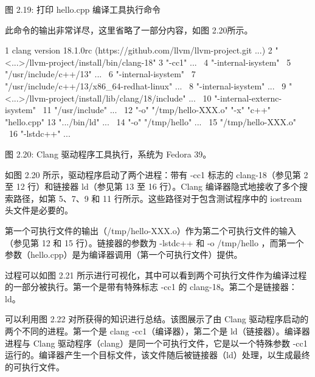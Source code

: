 \begin{center}
图 2.19: 打印 hello.cpp 编译工具执行命令
\end{center}

此命令的输出非常详尽，这里省略了一部分内容，如图 2.20所示。

\begin{shell}
1   clang version 18.1.0rc (https://github.com/llvm/llvm-project.git ...)
2   "<...>/llvm-project/install/bin/clang-18"
3     "-cc1" ... \
4     "-internal-isystem" \
5     "/usr/include/c++/13" ... \
6     "-internal-isystem" \
7     "/usr/include/c++/13/x86_64-redhat-linux" ... \
8     "-internal-isystem" ... \
9     "<...>/llvm-project/install/lib/clang/18/include" ... \
10    "-internal-externc-isystem" \
11    "/usr/include" ... \
12    "-o" "/tmp/hello-XXX.o" "-x" "c++" "hello.cpp"
13  ".../bin/ld" ... \
14    "-o" "/tmp/hello" ... \
15    "/tmp/hello-XXX.o" \
16    "-lstdc++" ...
\end{shell}

\begin{center}
图 2.20: Clang 驱动程序工具执行，系统为 Fedora 39。
\end{center}

如图 2.20 所示，驱动程序启动了两个进程：带有 -cc1 标志的 clang-18（参见第 2 至 12 行）和链接器 ld（参见第 13 至 16 行）。Clang 编译器隐式地接收了多个搜索路径，如第 5、7、9 和 11 行所示。这些路径对于包含测试程序中的 iostream 头文件是必要的。

第一个可执行文件的输出（/tmp/hello-XXX.o）作为第二个可执行文件的输入（参见第 12 和 15 行）。链接器的参数为 -lstdc++ 和 -o /tmp/hello ，而第一个参数（hello.cpp）是为编译器调用（第一个可执行文件）提供。


过程可以如图 2.21 所示进行可视化，其中可以看到两个可执行文件作为编译过程的一部分被执行。第一个是带有特殊标志 -cc1 的 clang-18。第二个是链接器：ld。

\newpage


可以利用图 2.22 对所获得的知识进行总结。该图展示了由 Clang 驱动程序启动的两个不同的进程。第一个是 clang -cc1（编译器），第二个是 ld（链接器）。编译器进程与 Clang 驱动程序（clang）是同一个可执行文件，它是以一个特殊参数 -cc1 运行的。编译器产生一个目标文件，该文件随后被链接器（ld）处理，以生成最终的可执行文件。

